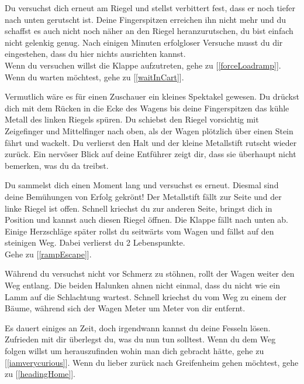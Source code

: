 Du versuchst dich erneut am Riegel und stellst verbittert fest, dass er noch tiefer nach unten gerutscht ist. Deine Fingerspitzen erreichen ihn nicht mehr und du schaffst es auch nicht noch näher an den Riegel heranzurutschen, du bist einfach nicht gelenkig genug. Nach einigen Minuten erfolgloser Versuche musst du dir eingestehen, dass du hier nichts ausrichten kannst.
\\Wenn du versuchen willst die Klappe aufzutreten, gehe zu [\ref{forceLoadramp}].
\\Wenn du warten möchtest, gehe zu [\ref{waitInCart}].


Vermutlich wäre es für einen Zuschauer ein kleines Spektakel gewesen. Du drückst dich mit dem Rücken in die Ecke des Wagens bis deine Fingerspitzen das kühle Metall des linken Riegels spüren. Du schiebst den Riegel vorsichtig mit Zeigefinger und Mittelfinger nach oben, als der Wagen plötzlich über einen Stein fährt und wackelt. Du verlierst den Halt und der kleine Metallstift rutscht wieder zurück. Ein nervöser Blick auf deine Entführer zeigt dir, dass sie überhaupt nicht bemerken, was du da treibst.

Du sammelst dich einen Moment lang und versuchst es erneut. Diesmal sind deine Bemühungen von Erfolg gekrönt! Der Metallstift fällt zur Seite und der linke Riegel ist offen. Schnell kriechst du zur anderen Seite, bringst dich in Position und kannst auch diesen Riegel öffnen. Die Klappe fällt nach unten ab. Einige Herzschläge später rollst du seitwärts vom Wagen und fällst auf den steinigen Weg. Dabei verlierst du 2 Lebenspunkte.
\\Gehe zu [\ref{rampEscape}].


Während du versuchst nicht vor Schmerz zu stöhnen, rollt der Wagen weiter den Weg entlang. Die beiden Halunken ahnen nicht einmal, dass du nicht wie ein Lamm auf die Schlachtung wartest. Schnell kriechst du vom Weg zu einem der Bäume, während sich der Wagen Meter um Meter von dir entfernt.

Es dauert einiges an Zeit, doch irgendwann kannst du deine Fesseln lösen. Zufrieden mit dir überlegst du, was du nun tun solltest. Wenn du dem Weg folgen willst um herauszufinden wohin man dich gebracht hätte, gehe zu [\ref{iamverycurious}]. Wenn du lieber zurück nach Greifenheim gehen möchtest, gehe zu [\ref{headingHome}].


